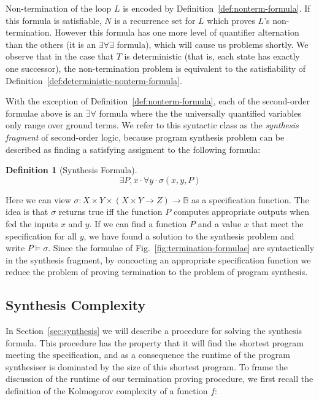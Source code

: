 \documentclass[preprint]{sigplanconf}
\theoremstyle{definition}
\newtheorem{definition}[theorem]{Definition}
\begin{document}
Non-termination of the loop $L$ is encoded by Definition~\ref{def:nonterm-formula}.
If this formula is satisfiable, $N$ is a recurrence set for $L$ which proves
$L$'s non-termination.  However this formula has one more level of quantifier alternation
than the others (it is an $\exists \forall \exists$ formula), which will cause us problems
shortly.  We observe that in the case that $T$ is deterministic (that is, each state has
exactly one successor),  the non-termination problem is equivalent to the
satisfiability of Definition~\ref{def:deterministic-nonterm-formula}.

With the exception of Definition~\ref{def:nonterm-formula}, each of the second-order formulae
above is an $\exists \forall$ formula where the the universally quantified variables only range over
ground terms.  We refer to this syntactic class as the \emph{synthesis fragment} of second-order
logic, because program synthesis problem can be described as finding a satisfying assigment to the
following formula:

\begin{definition}[Synthesis Formula]
 \label{def:synth-formula}
 $$\exists P, x \cdot \forall y \cdot \sigma(x, y, P)$$
\end{definition}

Here we can view $\sigma: X \times Y \times (X \times Y \to Z) \to \mathbb{B}$ as a specification function.
The idea is that $\sigma$ returns true iff the function $P$ computes appropriate outputs
when fed the inputs $x$ and $y$.  If we can find a function $P$ and a value $x$ that meet the specification
for all $y$, we have found a solution to the synthesis problem and write $P \models \sigma$.  Since the formulae
of Fig.~\ref{fig:termination-formulae} are syntactically in the synthesis fragment, by concocting an appropriate
specification function we reduce the problem of proving termination to the problem of
program synthesis.

\subsection{Synthesis Complexity}
In Section~\ref{sec:synthesis} we will describe a procedure for solving the synthesis formula.
This procedure has the property that it will find the shortest program meeting the
specification, and as a consequence the runtime of the program synthesiser is dominated
by the size of this shortest program.  To frame the discussion of the runtime of our
termination proving procedure, we first recall the definition of the Kolmogorov complexity
of a function $f$:
\end{document}

